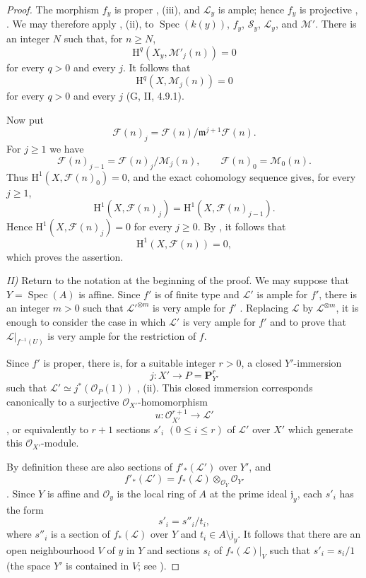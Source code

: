 \documentclass[oneside]{amsart}
\theoremstyle{ega-env-style}
\theoremstyle{ega-thm-env-style}
\theoremstyle{ega-defn-env-style}
\def\mathcal{\mathscr}
\def\sh{\mathcal}                   %
\def\bb{\mathbf}                    %
\def\leq{\leqslant}                 %
\def\geq{\geqslant}                 %
\def\HH{\mathrm{H}}                 %
\def\kres{k}                        %
\def\Spec{\operatorname{Spec}}
\newcommand{\oldpage}[2][]{{\marginnote{\normalfont{\textbf{#1}~|~#2}}}\ignorespaces}
\begin{document}
\begin{proof}
The morphism $f_y$ is proper , (iii), and
$\sh{L}_y$ is ample; hence $f_y$ is projective
, .  We may therefore apply
, (ii), to
$\Spec(\kres(y))$, $f_y$, $\sh{S}_y$, $\sh{L}_y$, and $\sh{M}'$.
There is an integer $N$ such that, for $n\geq N$,
\[
  \HH^q(X_y,\sh{M}'_j(n))=0
\]
for every $q>0$ and every $j$.  It follows that
\[
  \HH^q(X,\sh{M}_j(n))=0
\]
for every $q>0$ and every $j$ (G, II, 4.9.1).

Now put
\[
  \sh{F}(n)_j
  =
  \sh{F}(n)/\mathfrak m^{j+1}\sh{F}(n).
\]
For $j\geq1$ we have
\[
  \sh{F}(n)_{j-1}
  =
  \sh{F}(n)_j/\sh{M}_j(n),
  \qquad
  \sh{F}(n)_0=\sh{M}_0(n).
\]
Thus $\HH^1(X,\sh{F}(n)_0)=0$, and the exact cohomology sequence
gives, for every $j\geq1$,
\[
  \HH^1(X,\sh{F}(n)_j)
  =
  \HH^1(X,\sh{F}(n)_{j-1}).
\]
Hence $\HH^1(X,\sh{F}(n)_j)=0$ for every $j\geq0$.  By
, it follows that
\[
  \HH^1(X,\sh{F}(n))=0,
\]
which proves the assertion.

\oldpage[III]{146}

\noindent\textit{II)} Return to the notation at the beginning of
the proof.  We may suppose that $Y=\Spec(A)$ is affine.  Since
$f'$ is of finite type and $\sh{L}'$ is ample for $f'$, there is an
integer $m>0$ such that $\sh{L}'^{\otimes m}$ is very ample for
$f'$ .  Replacing $\sh{L}$ by
$\sh{L}^{\otimes m}$, it is enough to consider the case in which
$\sh{L}'$ is very ample for $f'$ and to prove that
$\sh{L}|_{f^{-1}(U)}$ is very ample for the restriction of $f$.

Since $f'$ is proper, there is, for a suitable integer $r>0$, a
closed $Y'$-immersion
\[
  j:X'\longrightarrow P=\bb{P}_{Y'}^r
\]
such that $\sh{L}'\simeq j^*(\sh{O}_P(1))$
, (ii).  This closed immersion corresponds
canonically to a surjective $\sh{O}_{X'}$-homomorphism
\[
  u:\sh{O}_{X'}^{r+1}\longrightarrow\sh{L}'
\]
, or equivalently  to
$r+1$ sections $s'_i$ $(0\leq i\leq r)$ of $\sh{L}'$ over $X'$
which generate this $\sh{O}_{X'}$-module.

By definition these are also sections of $f'_*(\sh{L}')$ over
$Y'$, and
\[
  f'_*(\sh{L}')
  =
  f_*(\sh{L})\otimes_{\sh{O}_Y}\sh{O}_{Y'}
\]
.  Since $Y$ is affine and $\sh{O}_y$ is the
local ring of $A$ at the prime ideal $\mathfrak j_y$, each $s'_i$
has the form
\[
  s'_i=s''_i/t_i,
\]
where $s''_i$ is a section of $f_*(\sh{L})$ over $Y$ and
$t_i\in A\setminus\mathfrak j_y$.  It follows that there are an
open neighbourhood $V$ of $y$ in $Y$ and sections $s_i$ of
$f_*(\sh{L})|_V$ such that $s'_i=s_i/1$ (the space $Y'$ is
contained in $V$; see ).


\end{proof}
\end{document}
